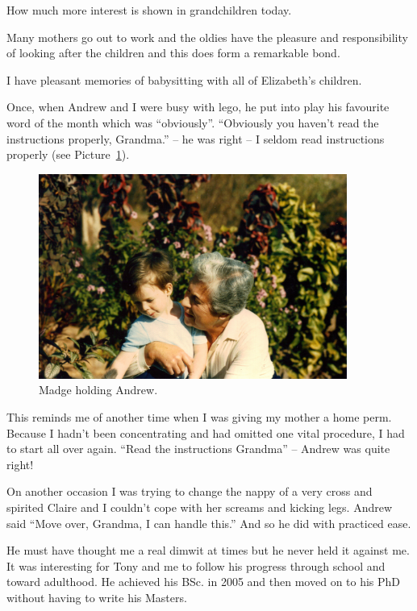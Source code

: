 How much more interest is shown in grandchildren today.

Many mothers go out to work and the oldies have the pleasure and
responsibility of looking after the children and this does form a
remarkable bond.

I have pleasant memories of babysitting with all of Elizabeth's
children.

Once, when Andrew and I were busy with lego, he put into play his
favourite word of the month which was ``obviously''. ``Obviously you
haven't read the instructions properly, Grandma.'' -- he was right --
I seldom read instructions properly (see Picture~\ref{madge-and-andrew}).

\begin{figure}
  \centering
  \includegraphics[width=0.9\textwidth]{photos/madge-and-andrew}
  \caption{Madge holding Andrew.}
  \label{madge-and-andrew}
\end{figure}

This reminds me of another time when I was giving my mother a home
perm. Because I hadn't been concentrating and had omitted one vital
procedure, I had to start all over again. ``Read the instructions
Grandma'' -- Andrew was quite right!

On another occasion I was trying to change the nappy of a very cross
and spirited Claire and I couldn't cope with her screams and kicking
legs. Andrew said ``Move over, Grandma, I can handle this.'' And so he
did with practiced ease.

He must have thought me a real dimwit at times but he never held it
against me. It was interesting for Tony and me to follow his progress
through school and toward adulthood. He achieved his BSc. in 2005 and
then moved on to his PhD without having to write his Masters.

